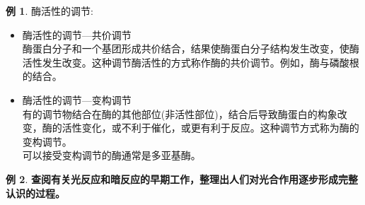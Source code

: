 \documentclass[UTF8]{article}
\theoremstyle{definition}
\newtheorem{example}{例}[section]
\begin{document}
\begin{example}
    酶活性的调节:\begin{itemize}
        \item 酶活性的调节---共价调节\\ 酶蛋白分子和一个基团形成共价结合，结果使酶蛋白分子结构发生改变，使酶活性发生改变。这种调节酶活性的方式称作酶的共价调节。例如，酶与磷酸根的结合。
        \item 酶活性的调节---变构调节\\ 有的调节物结合在酶的其他部位(非活性部位)，结合后导致酶蛋白的构象改变，酶的活性变化，或不利于催化，或更有利于反应。这种调节方式称为酶的变构调节。\\ 可以接受变构调节的酶通常是多亚基酶。
    \end{itemize}
\end{example}\begin{example}\textbf{查阅有关光反应和暗反应的早期工作，整理出人们对光合作用逐步形成完整认识的过程。}


\end{example}
\end{document}
